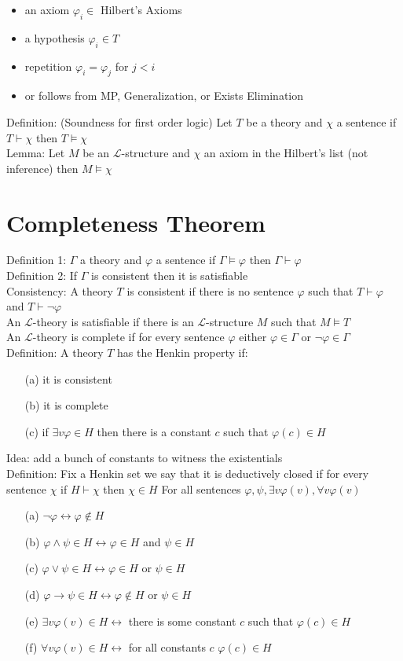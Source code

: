 \documentclass[10pt]{article}
\begin{document}
\begin{itemize}
    \item an axiom $\varphi_i\in$ Hilbert's Axioms
    \item a hypothesis $\varphi_i\in T$
    \item repetition $\varphi_i=\varphi_j$ for $j<i$
    \item or follows from MP, Generalization, or Exists Elimination
\end{itemize}
Definition: (Soundness for first order logic) Let $T$ be a theory and $\chi$ a sentence if $T\vdash\chi$ then $T\models\chi$\\
Lemma: Let $M$ be an $\mathcal{L}$-structure and $\chi$ an axiom in the Hilbert's list (not inference) then $M\models\chi$
\section*{Completeness Theorem}
Definition 1: $\Gamma$ a theory and $\varphi$ a sentence if $\Gamma\models\varphi$ then $\Gamma\vdash\varphi$\\
Definition 2: If $\Gamma$ is consistent then it is satisfiable\\
Consistency: A theory $T$ is consistent if there is no sentence $\varphi$ such that $T\vdash\varphi$ and $T\vdash\lnot\varphi$\\
An $\mathcal{L}$-theory is satisfiable if there is an $\mathcal{L}$-structure $M$ such that $M\models T$\\
An $\mathcal{L}$-theory is complete if for every sentence $\varphi$ either $\varphi\in\Gamma$ or $\lnot\varphi\in\Gamma$\\
Definition: A theory $T$ has the Henkin property if:
\begin{itemize}
    \item [(a)] it is consistent
    \item [(b)] it is complete
    \item [(c)] if $\exists v \varphi\in H$ then there is a constant $c$ such that $\varphi(c)\in H$
\end{itemize}
Idea: add a bunch of constants to witness the existentials\\
Definition: Fix a Henkin set we say that it is deductively closed if for every sentence $\chi$ if $H\vdash\chi$ then $\chi\in H$
For all sentences $\varphi,\psi,\exists v\varphi(v),\forall v\varphi(v)$
\begin{itemize}
    \item [(a)] $\lnot\varphi\leftrightarrow\varphi\not\in H$
    \item [(b)] $\varphi\land\psi\in H\leftrightarrow\varphi\in H$ and $\psi\in H$
    \item [(c)] $\varphi\lor\psi\in H\leftrightarrow\varphi\in H$ or $\psi\in H$
    \item [(d)] $\varphi\rightarrow\psi\in H\leftrightarrow\varphi\not\in H$ or $\psi\in H$
    \item [(e)] $\exists v\varphi(v)\in H\leftrightarrow$ there is some constant $c$ such that $\varphi(c)\in H$
    \item [(f)] $\forall v\varphi(v)\in H\leftrightarrow$ for all constants $c$ $\varphi(c)\in H$
\end{itemize} 
\end{document}
